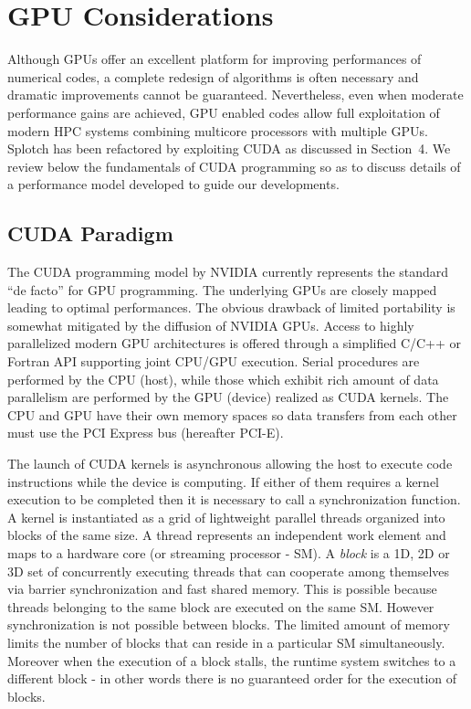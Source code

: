 \documentclass[1p]{elsarticle}
\begin{document}
\section{GPU Considerations}
\label{sec:gpu-code}
Although GPUs offer an excellent platform for improving performances of numerical codes, a complete redesign of algorithms is often necessary and dramatic improvements cannot be guaranteed. Nevertheless, even when moderate performance gains are achieved, GPU enabled codes allow full exploitation of modern HPC systems combining multicore processors with multiple GPUs. Splotch has been refactored by exploiting CUDA as discussed in Section~4. We review below the fundamentals of CUDA programming so as to discuss details of a performance model developed to guide our developments.


\subsection{CUDA Paradigm} 
\label{sec:cuda}

The CUDA programming model \cite{cudaurl} by NVIDIA currently represents the standard ``de facto'' for GPU programming. The underlying GPUs are closely mapped leading to optimal performances. The obvious drawback of limited portability is somewhat mitigated by the diffusion of NVIDIA GPUs. Access to highly parallelized modern GPU architectures is offered through a simplified C/C++ or Fortran API supporting joint CPU/GPU execution. Serial procedures are performed by the CPU (host), while those which exhibit rich amount of data parallelism are performed by the GPU (device) realized as CUDA kernels. The CPU and GPU have their own memory spaces so data transfers from each other must use the PCI Express bus (hereafter PCI-E). 

The launch of CUDA kernels is asynchronous allowing the host to execute code instructions while the device is computing. If either of them requires a kernel execution to be completed then it is necessary to call a synchronization function. A kernel is instantiated as a grid of lightweight parallel threads organized into blocks of the same size. A thread represents an independent work element and maps to a hardware core (or streaming processor - SM). A {\em block} is a 1D, 2D or 3D set of concurrently executing threads that can cooperate among themselves via barrier synchronization and fast shared memory. This is possible because threads belonging to the same block are executed on the same SM. However synchronization is not possible between blocks. The limited amount of memory limits the number of  blocks that can reside in a particular SM simultaneously. Moreover when the execution of a block stalls, the runtime system switches to a different block - in other words there is no guaranteed order for the execution of blocks.
\end{document}
